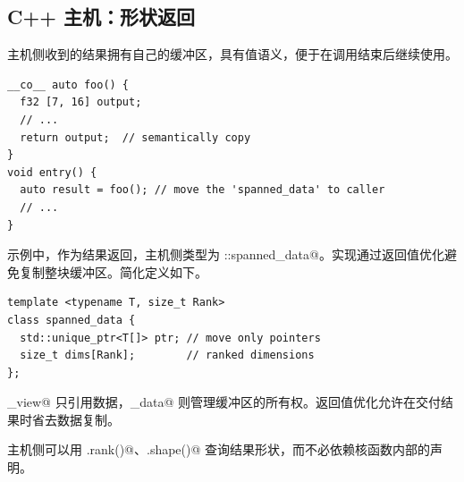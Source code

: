 \subsection*{C++ 主机：形状返回}

主机侧收到的结果拥有自己的缓冲区，具有值语义，便于在调用结束后继续使用。

\begin{lstlisting}[language=croqtile,caption={返回带形状的缓冲区}]
__co__ auto foo() {
  f32 [7, 16] output;
  // ...
  return output;  // semantically copy
}
void entry() {
  auto result = foo(); // move the 'spanned_data' to caller
  // ...
}
\end{lstlisting}

示例中，\co@output@ 作为结果返回，主机侧类型为 \co@croq::spanned_data@。实现通过返回值优化避免复制整块缓冲区。简化定义如下。

\begin{lstlisting}[language=croqtile,caption={主机侧结果包装器}]
template <typename T, size_t Rank>
class spanned_data {
  std::unique_ptr<T[]> ptr; // move only pointers
  size_t dims[Rank];        // ranked dimensions
};
\end{lstlisting}

\co@spanned_view@ 只引用数据，\co@spanned_data@ 则管理缓冲区的所有权。返回值优化允许在交付结果时省去数据复制。

主机侧可以用 \co@.rank()@、\co@.shape()@ 查询结果形状，而不必依赖核函数内部的声明。
